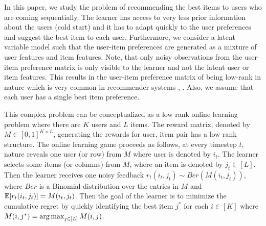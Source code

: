 In this paper, we study the problem of recommending the best items to users who are coming sequentially. The learner has access to very less prior information about the users (cold start) and it has to adapt quickly to the user preferences and suggest the best item to each user. Furthermore, we consider a latent variable model such that the user-item preferences are generated as a mixture of user features and item features. Note, that only noisy observations from the user-item preference matrix is only visible to the learner and not the latent user or item features. This results in the user-item preference matrix of being low-rank in nature which is very common in recommender systems \citep{koren2009matrix}, \citep{ricci2011liorrokach}. Also, we assume that each user has a single best item preference.



	This complex problem can be conceptualized as a low rank online learning  problem where there are $K$ users and $L$ items. The reward matrix, denoted by $M\in [0,1]^{K\times L}$,  generating the rewards for user, item pair has a low rank structure. The online learning game proceeds as follows, at every timestep $t$,  nature reveals one user (or row) from $M$ where user is denoted by $i_t$. The learner selects some items (or columns) from $M$, where an item is denoted by $j_t\in [L]$. Then the learner receives one noisy feedback $r_{t}(i_t,j_t)\sim Ber(M(i_t,j_t))$, where $Ber$ is a Binomial distribution over the entries in $M$ and $\mathbb{E}[r_{t}(i_t,j_t)] = M(i_t,j_t)$. Then the goal of the learner is to minimize the cumulative regret by quickly identifying the best item $j^*$ for each $i\in [K]$ where $M(i,j^*) = \mathop{\rm arg\,max} _{j\in[L]} M(i,j)$. 